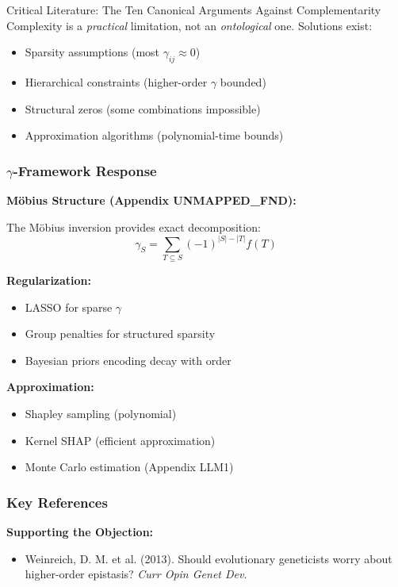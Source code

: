 \begin{chapter}{Critical Literature: The Ten Canonical Arguments Against Complementarity}
Complexity is a \textit{practical} limitation, not an \textit{ontological} one. Solutions exist:
\begin{itemize}[noitemsep]
    \item Sparsity assumptions (most $\gamma_{ij} \approx 0$)
    \item Hierarchical constraints (higher-order $\gamma$ bounded)
    \item Structural zeros (some combinations impossible)
    \item Approximation algorithms (polynomial-time bounds)
\end{itemize}

\subsubsection{$\gamma$-Framework Response}

\textbf{Möbius Structure (Appendix UNMAPPED_FND):}

The Möbius inversion provides exact decomposition:
\[
\gamma_S = \sum_{T \subseteq S} (-1)^{|S|-|T|} f(T)
\]

\textbf{Regularization:}
\begin{itemize}[noitemsep]
    \item LASSO for sparse $\gamma$
    \item Group penalties for structured sparsity
    \item Bayesian priors encoding decay with order
\end{itemize}

\textbf{Approximation:}
\begin{itemize}[noitemsep]
    \item Shapley sampling (polynomial)
    \item Kernel SHAP (efficient approximation)
    \item Monte Carlo estimation (Appendix LLM1)
\end{itemize}

\subsubsection{Key References}

\textbf{Supporting the Objection:}
\begin{itemize}[noitemsep]
    \item Weinreich, D. M. et al. (2013). Should evolutionary geneticists worry about higher-order epistasis? \textit{Curr Opin Genet Dev}.
\end{itemize}


\end{chapter}
